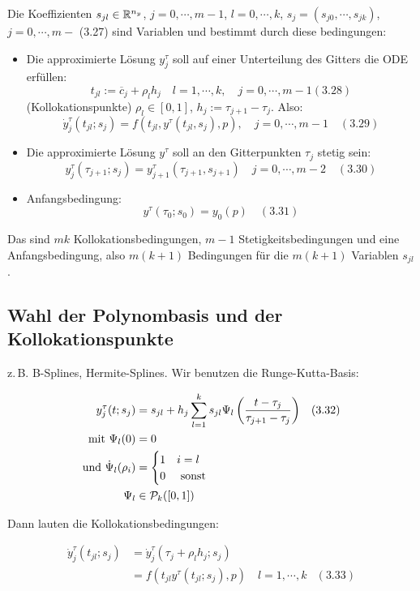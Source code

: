 Die Koeffizienten $s_{jl} \in \mathbb{R}^{n_y}$, $j=0,\cdots,m-1$, $l=0,\cdots,k$, $s_j = (s_{j0},\cdots,s_{jk})$, $j=0,\cdots,m-$ (3.27) sind Variablen und bestimmt durch diese bedingungen:

\begin{itemize}
\item Die approximierte Lösung $y_j^\tau$ soll auf einer Unterteilung des Gitters die ODE erfüllen:
\[ t_{jl} := \overline c_j + \rho_l h_j \quad l= 1,\cdots,k, \quad j=0,\cdots,m-1 (3.28) \]
(Kollokationspunkte) $\rho_l \in [0,1]$, $h_j := \tau_{j+1}-\tau_j$. Also:
\[ \dot y_j^\tau (t_{jl}; s_j) = f(t_{jl}, y^\tau (t_{jl},s_j),p), \quad j=0,\cdots,m-1 \quad (3.29) \]
\item Die approximierte Lösung $y^\tau$ soll an den Gitterpunkten $\tau_j$ stetig sein:
\[ y_j^\tau (\tau_{j+1};s_j) = y_{j+1}^\tau(\tau_{j+1},s_{j+1}) \quad j=0,\cdots,m-2 \quad (3.30) \]
\item Anfangsbedingung:
\[y^\tau(\tau_0;s_0) = y_0(p) \quad (3.31) \]
\end{itemize}

Das sind $mk$ Kollokationsbedingungen, $m-1$ Stetigkeitsbedingungen und eine Anfangsbedingung, also $m(k+1)$ Bedingungen für die $m(k+1)$ Variablen $s_{jl}$.

\subsection*{Wahl der Polynombasis und der Kollokationspunkte}

z.\,B. B-Splines, Hermite-Splines. Wir benutzen die Runge-Kutta-Basis:

\begin{align*}
y_j^\tau(t;s_j) &= s_{jl} + h_j \sum\limits_{l=1}^k s_{jl} \Psi_l \left( \frac{t-\tau_j}{\tau_{j+1}-\tau_j} \right) & (3.32) \\
\text{mit } \Psi_l(0) &= 0 \\
\text{und } \dot\Psi_l(\rho_i) &= \begin{cases} 1 & i=l \\ 0 & \text{ sonst } \end{cases} \\
\Psi_l & \in \mathcal{P}_k([0,1])
\end{align*}

Dann lauten die Kollokationsbedingungen:

\begin{align*}
\dot y_j^\tau(t_{jl}; s_j) &= \dot y_j^\tau(\tau_j+\rho_l h_j; s_j) \\
&= f(t_{jl} y^\tau(t_{jl}; s_j),p) \quad l=1,\cdots,k & (3.33) \\
\end{align*}

